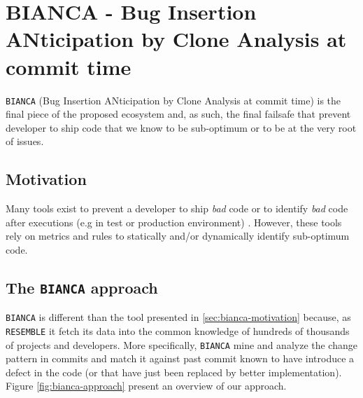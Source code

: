 
\section{BIANCA - Bug Insertion ANticipation by Clone Analysis at commit time\label{sec:BIANCA}}

{\tt BIANCA} (Bug Insertion ANticipation by Clone Analysis at commit time) is the final piece of the proposed ecosystem and, as such, the final failsafe that prevent developer to ship code that we know to be sub-optimum or to be at the very root of issues.

\subsection{Motivation\label{sec:bianca-motivation}}

Many tools exist to prevent a developer to ship {\it bad} code \cite{Dangel2000,Hovemeyer2007,Moha2010} or to identify {\it bad} code after executions (e.g in test or production environment) \cite{Nayrolles,Nayrolles2013a}.
However, these tools rely on metrics and rules to statically and/or dynamically identify sub-optimum code.

\subsection{The {\tt BIANCA} approach\label{sec:bianca-approach}}

{\tt BIANCA} is different than the tool presented in \ref{sec:bianca-motivation} because, as {\tt RESEMBLE} it fetch its data into the common knowledge of hundreds of thousands of projects and developers.
More specifically, {\tt BIANCA} mine and analyze the change pattern in commits and match it against past commit known to have introduce a defect in the code (or that have just been replaced by better implementation). Figure \ref{fig:bianca-approach} present an overview of our approach.

